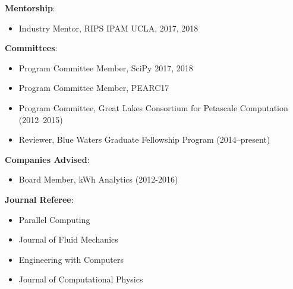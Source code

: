 
\textbf{Mentorship}:
\begin{itemize}
\itemsep 0pt
 \item Industry Mentor, RIPS IPAM UCLA, 2017, 2018
\end{itemize}

\blankline


\textbf{Committees}:
\begin{itemize}
\itemsep 0pt
 \item Program Committee Member, SciPy 2017, 2018
 \item Program Committee Member, PEARC17
 \item Program Committee, Great Lakes Consortium for Petascale Computation (2012--2015)
 \item Reviewer, Blue Waters Graduate Fellowship Program (2014--present)
\end{itemize}
\blankline


\textbf{Companies Advised}:
\begin{itemize}
\itemsep 0pt
 \item Board Member, kWh Analytics (2012-2016)
\end{itemize}

\blankline

\textbf{Journal Referee}:
\begin{itemize}
\itemsep 0pt
 \item Parallel Computing
 \item Journal of Fluid Mechanics
 \item Engineering with Computers
 \item Journal of Computational Physics
\end{itemize}
